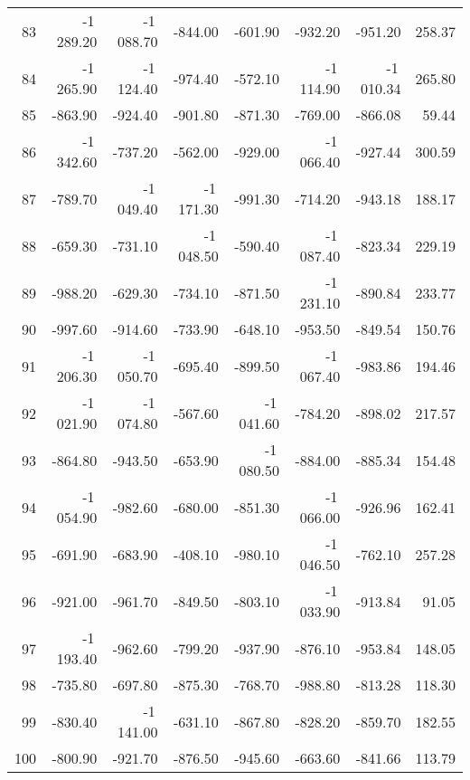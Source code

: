 \begin{longtable}{rrrrrrrr}
83 & -1\,289.20 & -1\,088.70 & -844.00 & -601.90 & -932.20 & -951.20 & 258.37  \\
84 & -1\,265.90 & -1\,124.40 & -974.40 & -572.10 & -1\,114.90 & -1\,010.34 & 265.80  \\
85 & -863.90 & -924.40 & -901.80 & -871.30 & -769.00 & -866.08 & 59.44  \\
86 & -1\,342.60 & -737.20 & -562.00 & -929.00 & -1\,066.40 & -927.44 & 300.59  \\
87 & -789.70 & -1\,049.40 & -1\,171.30 & -991.30 & -714.20 & -943.18 & 188.17  \\
88 & -659.30 & -731.10 & -1\,048.50 & -590.40 & -1\,087.40 & -823.34 & 229.19  \\
89 & -988.20 & -629.30 & -734.10 & -871.50 & -1\,231.10 & -890.84 & 233.77  \\
90 & -997.60 & -914.60 & -733.90 & -648.10 & -953.50 & -849.54 & 150.76  \\
91 & -1\,206.30 & -1\,050.70 & -695.40 & -899.50 & -1\,067.40 & -983.86 & 194.46  \\
92 & -1\,021.90 & -1\,074.80 & -567.60 & -1\,041.60 & -784.20 & -898.02 & 217.57  \\
93 & -864.80 & -943.50 & -653.90 & -1\,080.50 & -884.00 & -885.34 & 154.48  \\
94 & -1\,054.90 & -982.60 & -680.00 & -851.30 & -1\,066.00 & -926.96 & 162.41  \\
95 & -691.90 & -683.90 & -408.10 & -980.10 & -1\,046.50 & -762.10 & 257.28  \\
96 & -921.00 & -961.70 & -849.50 & -803.10 & -1\,033.90 & -913.84 & 91.05  \\
97 & -1\,193.40 & -962.60 & -799.20 & -937.90 & -876.10 & -953.84 & 148.05  \\
98 & -735.80 & -697.80 & -875.30 & -768.70 & -988.80 & -813.28 & 118.30  \\
99 & -830.40 & -1\,141.00 & -631.10 & -867.80 & -828.20 & -859.70 & 182.55  \\
100 & -800.90 & -921.70 & -876.50 & -945.60 & -663.60 & -841.66 & 113.79  \\

\end{longtable}


